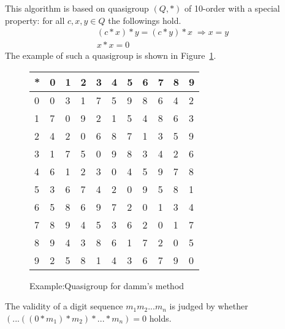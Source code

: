 This algorithm is based on quasigroup $(Q,*)$
of 10-order with a special property:
for all $c,x,y \in Q$ the followings hold.
\begin{align}
 &(c*x)*y = (c*y)*x \;\Rightarrow x = y \label{eq:antiSym1}\\
&x*x = 0
\end{align}
The example of such a quasigroup is shown in Figure~\ref{fig:10digitsQuasi}.

\begin{figure}[htb]
 \begin{center}
\begin{tabular}{| l || l | l | l | l | l | l | l | l | l | l |}
 \hline
* & 0 & 1 & 2 & 3 & 4 & 5 & 6 & 7 & 8 & 9\\
\hline\hline
0 & 0 & 3 & 1 & 7 & 5 & 9 & 8 & 6 & 4 & 2\\
\hline
1 & 7 & 0 & 9 & 2 & 1 & 5 & 4 & 8 & 6 & 3\\
\hline
2 & 4 & 2 & 0 & 6 & 8 & 7 & 1 & 3 & 5 & 9\\
\hline
3 & 1 & 7 & 5 & 0 & 9 & 8 & 3 & 4 & 2 & 6\\
\hline
4 & 6 & 1 & 2 & 3 & 0 & 4 & 5 & 9 & 7 & 8\\
\hline
5 & 3 & 6 & 7 & 4 & 2 & 0 & 9 & 5 & 8 & 1\\
\hline
6 & 5 & 8 & 6 & 9 & 7 & 2 & 0 & 1 & 3 & 4\\
\hline
7 & 8 & 9 & 4 & 5 & 3 & 6 & 2 & 0 & 1 & 7\\
\hline
8 & 9 & 4 & 3 & 8 & 6 & 1 & 7 & 2 & 0 & 5\\
\hline
9 & 2 & 5 & 8 & 1 & 4 & 3 & 6 & 7 & 9 & 0\\
\hline
\end{tabular}
 \end{center}
\caption{Example:Quasigroup for damm's method}
\label{fig:10digitsQuasi}
\end{figure}
The validity of a digit sequence $m_1 m_2 ... m_n$ is judged by whether
$(...((0*m_1)*m_2)*...*m_n) = 0 $ holds.

